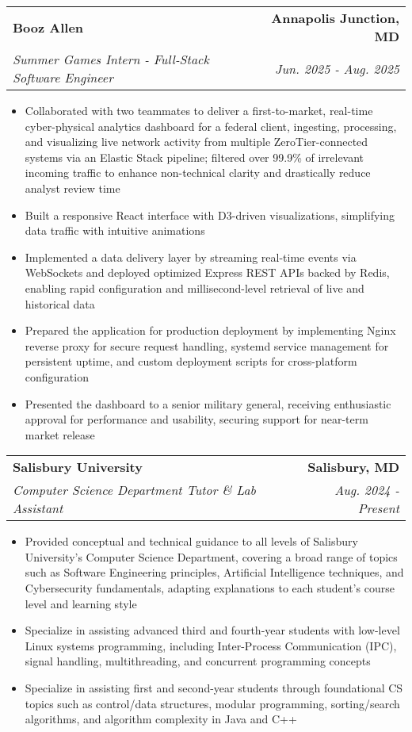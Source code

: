 \documentclass[letterpaper,11pt]{article}
\makeatletter
\newcommand{\resumeItem}[1]{
  \item\small{
    {#1 \vspace{-3pt}}
  }
}
\newcommand{\resumeSubheading}[4]{
  \vspace{-3pt}\item
    \begin{tabular*}{1.0\textwidth}[t]{l@{\extracolsep{\fill}}r}
      \textbf{#1} & \textbf{\small #2} \\
      \textit{\small#3} & \textit{\small #4} \\
    \end{tabular*}\vspace{-5pt}
}
\newcommand{\resumeItemListStart}{\begin{itemize}}
\newcommand{\resumeItemListEnd}{\end{itemize}\vspace{0pt}}
\makeatother
\begin{document}
        \resumeSubheading
        {Booz Allen}{Annapolis Junction, MD}
        {Summer Games Intern - Full-Stack Software Engineer}{Jun. 2025 - Aug. 2025}
        \resumeItemListStart
            \resumeItem{Collaborated with two teammates to deliver a first-to-market, real-time cyber-physical analytics dashboard for a federal client, ingesting, processing, and visualizing live network activity from multiple ZeroTier-connected systems via an Elastic Stack pipeline; filtered over 99.9\% of irrelevant incoming traffic to enhance non-technical clarity and drastically reduce analyst review time}
            \resumeItem{Built a responsive React interface with D3-driven visualizations, simplifying data traffic with intuitive animations}
            \resumeItem{Implemented a data delivery layer by streaming real-time events via WebSockets and deployed optimized Express REST APIs backed by Redis, enabling rapid configuration and millisecond-level retrieval of live and historical data}
            \resumeItem{Prepared the application for production deployment by implementing Nginx reverse proxy for secure request handling, systemd service management for persistent uptime, and custom deployment scripts for cross-platform configuration}
            \resumeItem{Presented the dashboard to a senior military general, receiving enthusiastic approval for performance and usability, securing support for near-term market release}
        \resumeItemListEnd
        \vspace{0\baselineskip} %
        
        \resumeSubheading
        {Salisbury University}{Salisbury, MD}
            {Computer Science Department Tutor \& Lab Assistant}{Aug. 2024 - Present}
                \resumeItemListStart
                    \resumeItem{Provided conceptual and technical guidance to all levels of Salisbury University’s Computer Science Department, covering a broad range of topics such as Software Engineering principles, Artificial Intelligence techniques, and Cybersecurity fundamentals, adapting explanations to each student’s course level and learning style}
                    \resumeItem{Specialize in assisting advanced third and fourth-year students with low-level Linux systems programming, including Inter-Process Communication (IPC), signal handling, multithreading, and concurrent programming concepts}
                    \resumeItem{Specialize in assisting first and second-year students through foundational CS topics such as control/data structures, modular programming, sorting/search algorithms, and algorithm complexity in Java and C++}
                \resumeItemListEnd
\end{document}
